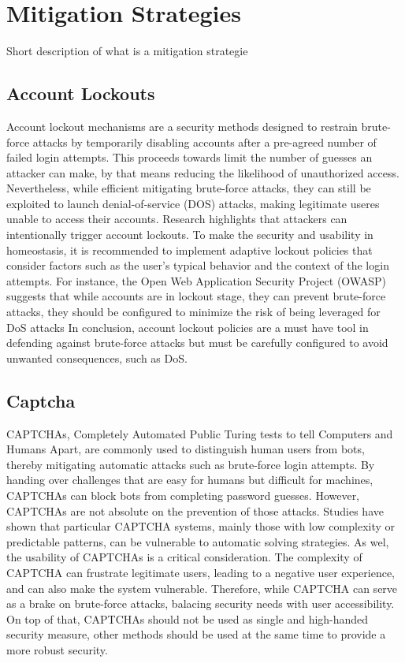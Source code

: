 \documentclass{comjnl}
\begin{document}
\section{Mitigation Strategies}

Short description of what is a mitigation strategie

\subsection{Account Lockouts}
Account lockout mechanisms are a security methods designed to restrain brute-force attacks by temporarily disabling accounts after a pre-agreed number of failed login attempts. This proceeds towards limit the number of guesses an attacker can make, by that means reducing the likelihood of unauthorized access. Nevertheless, while efficient mitigating brute-force attacks, they can still be exploited to launch denial-of-service (DOS) attacks, making legitimate useres unable to access their accounts. Research highlights that attackers can intentionally trigger account lockouts.\cite{account_lockout_dos} To make the security and usability in homeostasis, it is recommended to implement adaptive lockout policies that consider factors such as the user's typical behavior and the context of the login attempts. For instance, the Open Web Application Security Project (OWASP) suggests that while accounts are in lockout stage, they can prevent brute-force attacks, they should be configured to minimize the risk of being leveraged for DoS attacks \cite{blocking_brute_force} In conclusion, account lockout policies are a must have tool in defending against brute-force attacks but must be carefully configured to avoid unwanted consequences, such as DoS.

\subsection{Captcha}
CAPTCHAs, Completely Automated Public Turing tests to tell Computers and Humans Apart, are commonly used to distinguish human users from bots, thereby mitigating automatic attacks such as brute-force login attempts. By handing over challenges that are easy for humans but difficult for machines, CAPTCHAs can block bots from completing password guesses. However, CAPTCHAs are not absolute on the prevention of those attacks. Studies have shown that particular CAPTCHA systems, mainly those with low complexity or predictable patterns, can be vulnerable to automatic solving strategies. \cite{captcha_description} As wel, the usability of CAPTCHAs is a critical consideration. The complexity of CAPTCHA can frustrate legitimate users, leading to a negative user experience, and can also make the system vulnerable. Therefore, while CAPTCHA can serve as a brake on brute-force attacks, balacing security needs with user accessibility. On top of that, CAPTCHAs should not be used as single and high-handed security measure, other methods should be used at the same time to provide a more robust security. \cite{captcha_types} 
\end{document}

